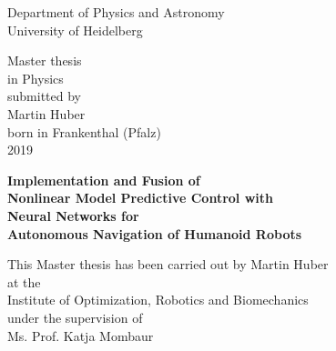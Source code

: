
\thispagestyle{empty}
\begin{center}
  \renewcommand{\baselinestretch}{2.00}
  \Large\sffamily
  Department of Physics and Astronomy\\
  \large University of Heidelberg
  \par\vfill\normalfont
  Master thesis\\
  in Physics\\
  submitted by\\
  Martin Huber\\
  born in Frankenthal (Pfalz)\\
  2019
\end{center}

\afterpage{\blankpage}
\newpage
\thispagestyle{empty}
\begin{center}
  \renewcommand{\baselinestretch}{2.00}
  \Large\bfseries\sffamily
    Implementation and Fusion of \\
	Nonlinear Model Predictive Control with \\
	Neural Networks for \\ 
	Autonomous Navigation of Humanoid Robots
  \par
  \vfill
  \large\normalfont
  This Master thesis has been carried out by Martin Huber\\
  at the\\
  Institute of Optimization, Robotics and Biomechanics \\
  under the supervision of\\
  Ms. Prof. Katja Mombaur
\end{center}\par
\vspace{5\baselineskip}

\renewcommand{\baselinestretch}{1.00}\normalsize